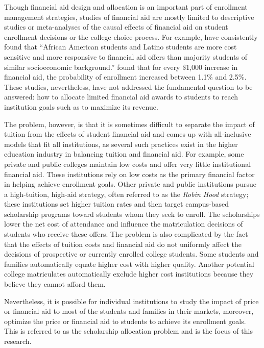 \documentclass[12pt,english]{report}
\begin{document}
Though financial aid design and allocation is an important part of enrollment
management strategies, studies of financial aid are mostly limited to
descriptive studies  or meta-analyses of the causal effects of financial aid
on student enrollment decisions or the college choice process.   For
example, \citet{Hossler1989} have consistently found that
``African American students and Latino students are more cost sensitive and
more responsive to financial aid offers than majority students of similar
socioeconomic background.''  \citet{Braunstein1999} found that for
every \$1,000 increase in financial aid, the probability  of  enrollment
increased between 1.1\% and 2.5\%.    These studies, nevertheless, have not
addressed the fundamental question to be answered: how to allocate limited
financial aid awards to students to reach institution goals such as to maximize
its revenue.

The problem, however, is that it is sometimes difficult to separate the impact
of tuition from the effects of student financial aid and comes up with
all-inclusive models that fit all institutions, as several such practices
exist in the higher education industry in balancing tuition and financial aid.
For example, some private and public colleges maintain low costs and offer very
little institutional financial aid. These institutions rely on low costs as the
primary financial factor in helping achieve enrollment goals. Other private and
public institutions pursue a high-tuition, high-aid strategy, often referred to
as the \textit{Robin Hood} strategy; these institutions set higher tuition
rates and then target campus-based scholarship programs toward students whom
they seek to enroll. The scholarships lower the net cost of attendance and
influence the matriculation decisions of students who receive these offers.
The problem is also complicated by the fact that the effects of tuition costs
and financial aid do not uniformly affect the decisions of prospective or
currently enrolled college students. Some students and families automatically
equate higher cost with higher quality. Another potential college matriculates
automatically exclude higher cost institutions because they believe they cannot
afford them.

Nevertheless, it is possible for individual institutions to study the impact of
price or financial aid to most of the students and families in their markets,
moreover, optimize the price or financial aid to students to achieve its
enrollment goals.  This is referred to as the scholarship allocation problem 
and is the focus of this research.
\end{document}
